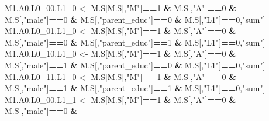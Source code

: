 \documentclass[
]{book}
\newenvironment{Shaded}{\begin{snugshade}}{\end{snugshade}}
\newcommand{\DecValTok}[1]{\textcolor[rgb]{0.00,0.00,0.81}{#1}}
\newcommand{\NormalTok}[1]{#1}
\newcommand{\OtherTok}[1]{\textcolor[rgb]{0.56,0.35,0.01}{#1}}
\newcommand{\SpecialCharTok}[1]{\textcolor[rgb]{0.81,0.36,0.00}{\textbf{#1}}}
\newcommand{\StringTok}[1]{\textcolor[rgb]{0.31,0.60,0.02}{#1}}
\begin{document}
\begin{Shaded}
\begin{Highlighting}[]
\NormalTok{  M1.A0.L0\_00.L1\_0 }\OtherTok{\textless{}{-}}\NormalTok{ M.S[M.S[,}\StringTok{"M"}\NormalTok{]}\SpecialCharTok{==}\DecValTok{1} \SpecialCharTok{\&}\NormalTok{ M.S[,}\StringTok{"A"}\NormalTok{]}\SpecialCharTok{==}\DecValTok{0} \SpecialCharTok{\&}\NormalTok{ M.S[,}\StringTok{"male"}\NormalTok{]}\SpecialCharTok{==}\DecValTok{0} \SpecialCharTok{\&} 
\NormalTok{                            M.S[,}\StringTok{"parent\_educ"}\NormalTok{]}\SpecialCharTok{==}\DecValTok{0} \SpecialCharTok{\&}\NormalTok{ M.S[,}\StringTok{"L1"}\NormalTok{]}\SpecialCharTok{==}\DecValTok{0}\NormalTok{,}\StringTok{"sum"}\NormalTok{]}
\NormalTok{  M1.A0.L0\_01.L1\_0 }\OtherTok{\textless{}{-}}\NormalTok{ M.S[M.S[,}\StringTok{"M"}\NormalTok{]}\SpecialCharTok{==}\DecValTok{1} \SpecialCharTok{\&}\NormalTok{ M.S[,}\StringTok{"A"}\NormalTok{]}\SpecialCharTok{==}\DecValTok{0} \SpecialCharTok{\&}\NormalTok{ M.S[,}\StringTok{"male"}\NormalTok{]}\SpecialCharTok{==}\DecValTok{0} \SpecialCharTok{\&} 
\NormalTok{                            M.S[,}\StringTok{"parent\_educ"}\NormalTok{]}\SpecialCharTok{==}\DecValTok{1} \SpecialCharTok{\&}\NormalTok{ M.S[,}\StringTok{"L1"}\NormalTok{]}\SpecialCharTok{==}\DecValTok{0}\NormalTok{,}\StringTok{"sum"}\NormalTok{]}
\NormalTok{  M1.A0.L0\_10.L1\_0 }\OtherTok{\textless{}{-}}\NormalTok{ M.S[M.S[,}\StringTok{"M"}\NormalTok{]}\SpecialCharTok{==}\DecValTok{1} \SpecialCharTok{\&}\NormalTok{ M.S[,}\StringTok{"A"}\NormalTok{]}\SpecialCharTok{==}\DecValTok{0} \SpecialCharTok{\&}\NormalTok{ M.S[,}\StringTok{"male"}\NormalTok{]}\SpecialCharTok{==}\DecValTok{1} \SpecialCharTok{\&} 
\NormalTok{                            M.S[,}\StringTok{"parent\_educ"}\NormalTok{]}\SpecialCharTok{==}\DecValTok{0} \SpecialCharTok{\&}\NormalTok{ M.S[,}\StringTok{"L1"}\NormalTok{]}\SpecialCharTok{==}\DecValTok{0}\NormalTok{,}\StringTok{"sum"}\NormalTok{]}
\NormalTok{  M1.A0.L0\_11.L1\_0 }\OtherTok{\textless{}{-}}\NormalTok{ M.S[M.S[,}\StringTok{"M"}\NormalTok{]}\SpecialCharTok{==}\DecValTok{1} \SpecialCharTok{\&}\NormalTok{ M.S[,}\StringTok{"A"}\NormalTok{]}\SpecialCharTok{==}\DecValTok{0} \SpecialCharTok{\&}\NormalTok{ M.S[,}\StringTok{"male"}\NormalTok{]}\SpecialCharTok{==}\DecValTok{1} \SpecialCharTok{\&} 
\NormalTok{                            M.S[,}\StringTok{"parent\_educ"}\NormalTok{]}\SpecialCharTok{==}\DecValTok{1} \SpecialCharTok{\&}\NormalTok{ M.S[,}\StringTok{"L1"}\NormalTok{]}\SpecialCharTok{==}\DecValTok{0}\NormalTok{,}\StringTok{"sum"}\NormalTok{]}
\NormalTok{  M1.A0.L0\_00.L1\_1 }\OtherTok{\textless{}{-}}\NormalTok{ M.S[M.S[,}\StringTok{"M"}\NormalTok{]}\SpecialCharTok{==}\DecValTok{1} \SpecialCharTok{\&}\NormalTok{ M.S[,}\StringTok{"A"}\NormalTok{]}\SpecialCharTok{==}\DecValTok{0} \SpecialCharTok{\&}\NormalTok{ M.S[,}\StringTok{"male"}\NormalTok{]}\SpecialCharTok{==}\DecValTok{0} \SpecialCharTok{\&} 

\end{Highlighting}
\end{Shaded}
\end{document}
